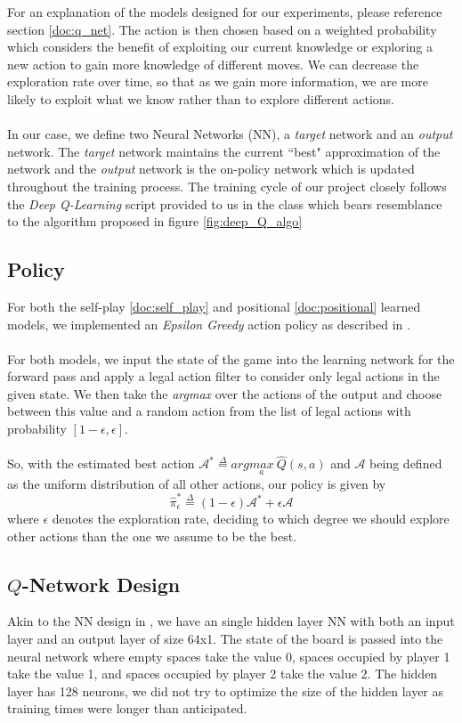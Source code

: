 \documentclass{article}
\begin{document}
\noindent
For an explanation of the models designed for our experiments, please reference section \ref{doc:q_net}. The action is then chosen based on a weighted probability which considers the benefit of exploiting our current knowledge or exploring a new action to gain more knowledge of different moves. We can decrease the exploration rate over time, so that as we gain more information, we are more likely to exploit what we know rather than to explore different actions.
\\\\
In our case, we define two Neural Networks (NN), a \textit{target} network and an \textit{output} network. The \textit{target} network maintains the current ``best" approximation of the network and the \textit{output} network is the on-policy network which is updated throughout the training process. The training cycle of our project closely follows the \textit{Deep Q-Learning} script provided to us in the class \cite{DQN} which bears resemblance to the algorithm proposed in figure \ref{fig:deep_Q_algo}

\subsection{\label{doc:pol}Policy}
For both the self-play \ref{doc:self_play} and positional \ref{doc:positional} learned models, we implemented an \textit{Epsilon Greedy} action policy as described in \cite{RL_book}. 
\\\\
For both models, we input the state of the game into the learning network for the forward pass and apply a legal action filter to consider only legal actions in the given state. We then take the \textit{argmax} over the actions of the output and choose between this value and a random action from the list of legal actions with probability $\left[1-\epsilon, \epsilon\right]$.
\\\\
So, with the estimated best action $\mathcal{A}^*\overset{\Delta}{=} arg\underset{a}{max}\  \hat{Q}(s,a)$ and $\mathcal{A}$ being defined as the uniform distribution of all other actions, our policy is given by
$$
\hat{\pi}_{\epsilon}^* \overset{\Delta}{=} (1-\epsilon)\mathcal{A}^* + \epsilon \mathcal{A}
$$
where $\epsilon$ denotes the exploration rate, deciding to which degree we should explore other actions than the one we assume to be the best.

\subsection{\label{doc:q_net}$Q$-Network Design}
Akin to the NN design in \cite{vanEck2008}, we have an single hidden layer NN with both an input layer and an output layer of size 64x1. The state of the board is passed into the neural network where empty spaces take the value 0, spaces occupied by player 1 take the value 1, and spaces occupied by player 2 take the value 2. The hidden layer has 128 neurons, we did not try to optimize the size of the hidden layer as training times were longer than anticipated.
\end{document}

